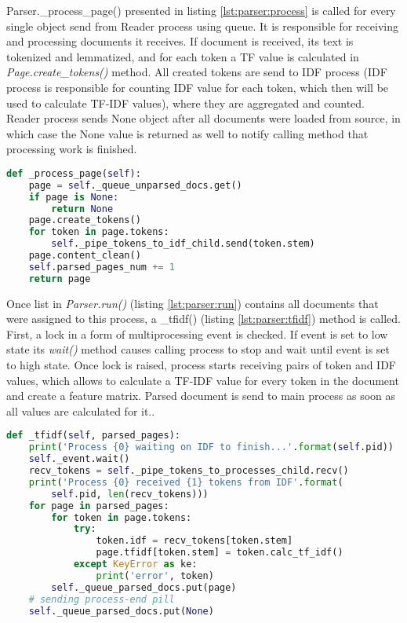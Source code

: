 Parser.\_process\_page() presented in listing \ref{lst:parser:process} is called for every single object send from Reader process using queue. It is responsible for receiving and processing documents it receives. If document is received, its text is tokenized and lemmatized, and for each token a TF value is calculated in \textit{Page.create\_tokens()} method. All created tokens are send to IDF process (IDF process is responsible for counting IDF value for each token, which then will be used to calculate TF-IDF values), where they are aggregated and counted. Reader process sends None object after all documents were loaded from source, in which case the None value is returned as well to notify calling method that processing work is finished.

\begin{lstlisting}[language=Python, caption={Parser.\_process\_page() - Processing of unparsed document}, label={lst:parser:process}]
def _process_page(self):
    page = self._queue_unparsed_docs.get()
    if page is None:
        return None
    page.create_tokens()
    for token in page.tokens:
        self._pipe_tokens_to_idf_child.send(token.stem)
    page.content_clean()
    self.parsed_pages_num += 1
    return page
\end{lstlisting}

Once list in \textit{Parser.run()} (listing \ref{lst:parser:run}) contains all documents that were assigned to this process, a \_tfidf() (listing \ref{lst:parser:tfidf}) method is called. First, a lock in a form of multiprocessing event is checked. If event is set to low state its \textit{wait()} method causes calling process to stop and wait until event is set to high state. Once lock is raised, process starts receiving pairs of token and IDF values, which allows to calculate a TF-IDF value for every token in the document and create a feature matrix. Parsed document is send to main process as soon as all values are calculated for it..

\begin{lstlisting}[language=Python, caption={Parser.\_tfidf() - calculating TD-IDF values for tokens in documents}, label={lst:parser:tfidf}]
def _tfidf(self, parsed_pages):
    print('Process {0} waiting on IDF to finish...'.format(self.pid))
    self._event.wait()
    recv_tokens = self._pipe_tokens_to_processes_child.recv()
    print('Process {0} received {1} tokens from IDF'.format(
        self.pid, len(recv_tokens)))
    for page in parsed_pages:
        for token in page.tokens:
            try:
                token.idf = recv_tokens[token.stem]
                page.tfidf[token.stem] = token.calc_tf_idf()
            except KeyError as ke:
                print('error', token)
        self._queue_parsed_docs.put(page)
    # sending process-end pill
    self._queue_parsed_docs.put(None)
\end{lstlisting}

